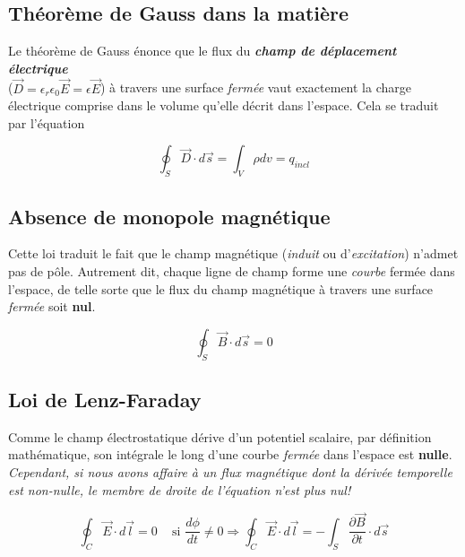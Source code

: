 
\subsection{Théorème de Gauss dans la matière}

Le théorème de Gauss énonce que le flux du \textit{\textbf{champ de déplacement électrique}} \\($\vec{D} = \epsilon_{r}\epsilon_{0}\vec{E} = \epsilon \vec{E}$)
à travers une surface \textit{fermée} vaut exactement la charge électrique comprise dans le volume qu'elle décrit dans l'espace. Cela se traduit par l'équation 

\begin{equation}
 \oint_{S} \vec{D} \cdot d\vec{s} = \int_{V} \rho dv = q_{incl}
 \label{GaussIntegral}
\end{equation}

\subsection{Absence de monopole magnétique}

Cette loi traduit le fait que le champ magnétique (\textit{induit} ou d'\textit{excitation}) n'admet pas de pôle. 
Autrement dit, chaque ligne de champ forme une \textit{courbe} fermée dans l'espace, de telle sorte que le flux 
du champ magnétique à travers une surface \textit{fermée} soit \textbf{nul}.

\begin{equation}
 \oint_{S} \vec{B} \cdot d\vec{s} = 0
 \label{MonoPoleIntegral}
\end{equation}

\subsection{Loi de Lenz-Faraday}

Comme le champ électrostatique dérive d'un potentiel scalaire, par définition mathématique, son intégrale le long 
d'une courbe \textit{fermée} dans l'espace est \textbf{nulle}. %
\textit{Cependant, si nous avons affaire à un flux magnétique dont la dérivée temporelle est non-nulle, le membre de droite de l'équation n'est plus nul!}

\begin{equation}
 \oint_{C} \vec{E} \cdot d\vec{l} = 0 \hspace{10pt} \mbox{ si } \frac{d\phi}{dt} \not = 0 \Rightarrow  \oint_{C} \vec{E} \cdot d\vec{l} = -\int_{S} \frac{\partial \vec{B}}{\partial t} \cdot d\vec{s}
 \label{PotentielIntegral}
\end{equation}


